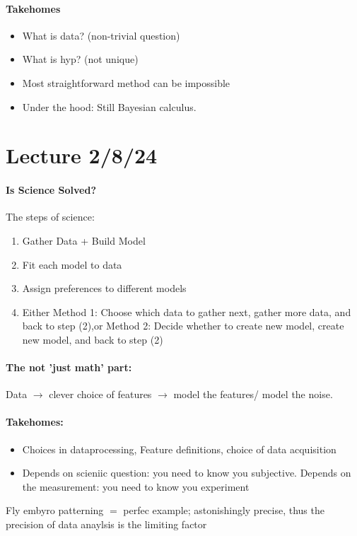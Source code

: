 \documentclass[../main.tex]{subfiles}
\begin{document}
\paragraph*{Takehomes}
\begin{itemize}
    \item What is data? (non-trivial question)
    \item What is hyp? (not unique)
    \item Most straightforward method can be impossible
    \item Under the hood: Still Bayesian calculus.
\end{itemize}

\newpage
\section*{Lecture 2/8/24}
\barh \vspace{10px}

\paragraph*{Is Science Solved?}
The steps of science:
\begin{enumerate}
    \item Gather Data + Build Model
    \item Fit each model to data
    \item Assign preferences to different models
    \item Either Method 1: Choose which data to gather next, gather more data, and back to step (2),or
    Method 2: Decide whether to create new model, create new model, and back to step (2)
\end{enumerate}

\paragraph*{The not 'just math' part:} Data $\to$ clever choice of features $\to$ model the
features/ model the noise.

\paragraph*{Takehomes:}
\begin{itemize}
    \item Choices in dataprocessing, Feature definitions, choice of data acquisition
    \item Depends on scieniic question: you need to know you subjective. Depends on the measurement:
    you need to know you experiment
\end{itemize}
Fly embyro patterning $=$ perfec example; astonishingly precise, thus the precision of data anaylsis
is the limiting factor
\end{document}
